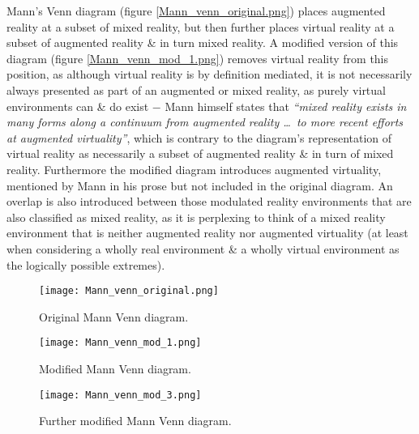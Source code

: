 
Mann's Venn diagram (figure \ref{Mann_venn_original.png}) places augmented reality at a subset of mixed reality, but then further places virtual reality at a subset of augmented reality \& in turn mixed reality. A modified version of this diagram (figure \ref{Mann_venn_mod_1.png}) removes virtual reality from this position, as although virtual reality is by definition mediated, it is not necessarily always presented as part of an augmented or mixed reality, as purely virtual environments can \& do exist $-$ Mann himself states that \textit{``mixed reality exists in many forms along a continuum from augmented reality \ldots\ to more recent efforts at augmented virtuality''}, which is contrary to the diagram's representation of virtual reality as necessarily a subset of augmented reality \& in turn of mixed reality. Furthermore the modified diagram introduces augmented virtuality, mentioned by Mann in his prose but not included in the original diagram. An overlap is also introduced between those modulated reality environments that are also classified as mixed reality, as it is perplexing to think of a mixed reality environment that is neither augmented reality nor augmented virtuality (at least when considering a wholly real environment \& a wholly virtual environment as the logically possible extremes).

\begin{figure}[h]
\centering
\begin{minipage}{.5\textwidth}
  \centering
  \texttt{[image: Mann\_venn\_original.png]}
  \caption{Original Mann Venn diagram.}
  \label{Mann_venn_original.png}
\end{minipage}%
\begin{minipage}{.5\textwidth}
  \centering
  \texttt{[image: Mann\_venn\_mod\_1.png]}
    \caption{Modified Mann Venn diagram.}
    \label{Mann_venn_mod_1.png}
\end{minipage}

\vspace{5mm}

\centering
  \texttt{[image: Mann\_venn\_mod\_3.png]}
  \caption{Further modified Mann Venn diagram.}
  \label{Mann_venn_mod_3.png}
\end{figure}

